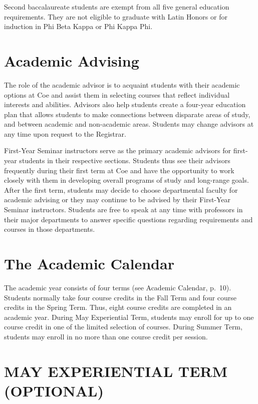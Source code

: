 \documentclass[
  letterpaper,
]{scrbook}
\begin{document}
Second baccalaureate students are exempt from all five general education
requirements. They are not eligible to graduate with Latin Honors or for
induction in Phi Beta Kappa or Phi Kappa Phi.

\section{Academic Advising}\label{academic-advising}

The role of the academic advisor is to acquaint students with their
academic options at Coe and assist them in selecting courses that
reflect individual interests and abilities. Advisors also help students
create a four-year education plan that allows students to make
connections between disparate areas of study, and between academic and
non-academic areas. Students may change advisors at any time upon
request to the Registrar.

First-Year Seminar instructors serve as the primary academic advisors
for first-year students in their respective sections. Students thus see
their advisors frequently during their first term at Coe and have the
opportunity to work closely with them in developing overall programs of
study and long-range goals. After the first term, students may decide to
choose departmental faculty for academic advising or they may continue
to be advised by their First-Year Seminar instructors. Students are free
to speak at any time with professors in their major departments to
answer specific questions regarding requirements and courses in those
departments.

\section{The Academic Calendar}\label{the-academic-calendar}

The academic year consists of four terms (see Academic Calendar, p.~10).
Students normally take four course credits in the Fall Term and four
course credits in the Spring Term. Thus, eight course credits are
completed in an academic year. During May Experiential Term, students
may enroll for up to one course credit in one of the limited selection
of courses. During Summer Term, students may enroll in no more than one
course credit per session.

\section{MAY EXPERIENTIAL TERM
(OPTIONAL)}\label{may-experiential-term-optional}
\end{document}

